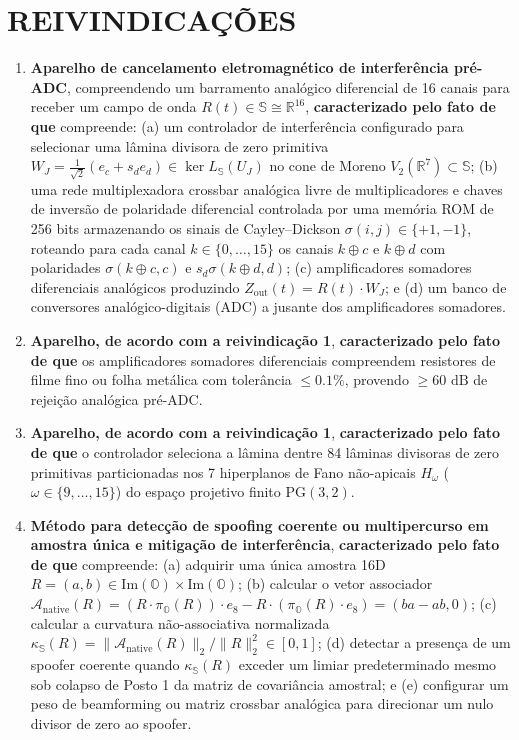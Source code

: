 \documentclass[12pt,a4paper]{article}
\begin{document}
\newpage
\section*{REIVINDICA\c{C}\~OES}
\begin{enumerate}[leftmargin=20pt,itemsep=4pt]
    \item \textbf{Aparelho de cancelamento eletromagn\'etico de interfer\^encia pr\'e-ADC}, compreendendo um barramento anal\'ogico diferencial de 16 canais para receber um campo de onda $R(t) \in \mathbb{S} \cong \mathbb{R}^{16}$, \textbf{caracterizado pelo fato de que} compreende: (a) um controlador de interfer\^encia configurado para selecionar uma l\^amina divisora de zero primitiva $W_J = \frac{1}{\sqrt{2}}(e_c + s_d e_d) \in \ker L_{\mathbb{S}}(U_J)$ no cone de Moreno $V_2(\mathbb{R}^7) \subset \mathbb{S}$; (b) uma rede multiplexadora crossbar anal\'ogica livre de multiplicadores e chaves de invers\~ao de polaridade diferencial controlada por uma mem\'oria ROM de 256 bits armazenando os sinais de Cayley--Dickson $\sigma(i, j) \in \{+1, -1\}$, roteando para cada canal $k \in \{0,\dots,15\}$ os canais $k \oplus c$ e $k \oplus d$ com polaridades $\sigma(k \oplus c, c)$ e $s_d \sigma(k \oplus d, d)$; (c) amplificadores somadores diferenciais anal\'ogicos produzindo $Z_{\mathrm{out}}(t) = R(t) \cdot W_J$; e (d) um banco de conversores anal\'ogico-digitais (ADC) a jusante dos amplificadores somadores.

    \item \textbf{Aparelho, de acordo com a reivindica\c{c}\~ao 1}, \textbf{caracterizado pelo fato de que} os amplificadores somadores diferenciais compreendem resistores de filme fino ou folha met\'alica com toler\^ancia $\le 0.1\%$, provendo $\ge 60\text{ dB}$ de rejei\c{c}\~ao anal\'ogica pr\'e-ADC.

    \item \textbf{Aparelho, de acordo com a reivindica\c{c}\~ao 1}, \textbf{caracterizado pelo fato de que} o controlador seleciona a l\^amina dentre 84 l\^aminas divisoras de zero primitivas particionadas nos 7 hiperplanos de Fano n\~ao-apicais $H_\omega$ ($\omega \in \{9,\dots,15\}$) do espa\c{c}o projetivo finito $\mathrm{PG}(3,2)$.

    \item \textbf{M\'etodo para detec\c{c}\~ao de spoofing coerente ou multipercurso em amostra \'unica e mitiga\c{c}\~ao de interfer\^encia}, \textbf{caracterizado pelo fato de que} compreende: (a) adquirir uma \'unica amostra 16D $R = (a, b) \in \mathrm{Im}(\mathbb{O}) \times \mathrm{Im}(\mathbb{O})$; (b) calcular o vetor associador $\mathcal{A}_{\mathrm{native}}(R) = (R \cdot \pi_{\mathbb{O}}(R)) \cdot e_8 - R \cdot (\pi_{\mathbb{O}}(R) \cdot e_8) = (ba - ab, 0)$; (c) calcular a curvatura n\~ao-associativa normalizada $\kappa_{\mathbb{S}}(R) = \|\mathcal{A}_{\mathrm{native}}(R)\|_2 / \|R\|_2^2 \in [0, 1]$; (d) detectar a presen\c{c}a de um spoofer coerente quando $\kappa_{\mathbb{S}}(R)$ exceder um limiar predeterminado mesmo sob colapso de Posto 1 da matriz de covari\^ancia amostral; e (e) configurar um peso de beamforming ou matriz crossbar anal\'ogica para direcionar um nulo divisor de zero ao spoofer.


\end{enumerate}
\end{document}
